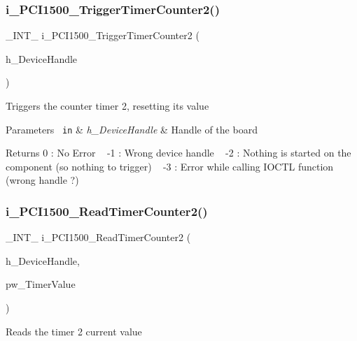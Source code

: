 \subsubsection{\texorpdfstring{i\_PCI1500\_TriggerTimerCounter2()}{i\_PCI1500\_TriggerTimerCounter2()}}
{\footnotesize\ttfamily \+\_\+\+I\+N\+T\+\_\+ i\+\_\+\+P\+C\+I1500\+\_\+\+Trigger\+Timer\+Counter2 (\begin{DoxyParamCaption}\item[{H\+A\+N\+D\+LE}]{h\+\_\+\+Device\+Handle }\end{DoxyParamCaption})}

Triggers the counter timer 2, resetting its value


\begin{DoxyParams}[1]{Parameters}
\mbox{\texttt{ in}}  & {\em h\+\_\+\+Device\+Handle} & Handle of the board\\
\hline
\end{DoxyParams}
\begin{DoxyReturn}{Returns}
0 \+: No Error ~\newline
 -\/1 \+: Wrong device handle ~\newline
 -\/2 \+: Nothing is started on the component (so nothing to trigger) ~\newline
 -\/3 \+: Error while calling I\+O\+C\+TL function (wrong handle ?) ~\newline

\end{DoxyReturn}
\mbox{\label{group___timer2_ga3e06d8298ba00f3652eb97082c7a5ea7}} 
\subsubsection{\texorpdfstring{i\_PCI1500\_ReadTimerCounter2()}{i\_PCI1500\_ReadTimerCounter2()}}
{\footnotesize\ttfamily \+\_\+\+I\+N\+T\+\_\+ i\+\_\+\+P\+C\+I1500\+\_\+\+Read\+Timer\+Counter2 (\begin{DoxyParamCaption}\item[{H\+A\+N\+D\+LE}]{h\+\_\+\+Device\+Handle,  }\item[{P\+W\+O\+RD}]{pw\+\_\+\+Timer\+Value }\end{DoxyParamCaption})}

Reads the timer 2 current value


